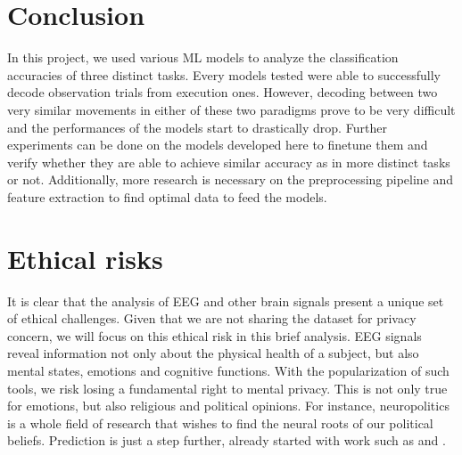 \documentclass[10pt,conference,compsocconf]{IEEEtran}
\begin{document}
\section{Conclusion}
\label{sec:conclusion}
In this project, we used various ML models to analyze the classification accuracies of three distinct tasks. Every models tested were able to successfully decode observation trials from execution ones. However, decoding between two very similar movements in either of these two paradigms prove to be very difficult and the performances of the models start to drastically drop. Further experiments can be done on the models developed here to finetune them and verify whether they are able to achieve similar accuracy as in more distinct tasks or not. Additionally, more research is necessary on the preprocessing pipeline and feature extraction to find optimal data to feed the models.



\newpage
\section{Ethical risks}
It is clear that the analysis of EEG and other brain signals present a unique set of ethical challenges. Given that we are not sharing the dataset for privacy concern, we will focus on this ethical risk in this brief analysis. EEG signals reveal information not only about the physical health of a subject, but also mental states, emotions and cognitive functions. With the popularization of such tools, we risk losing a fundamental right to mental privacy. This is not only true for emotions, but also religious and political opinions. For instance, neuropolitics \cite{neuropolitics} is a whole field of research that wishes to find the neural roots of our political beliefs. Prediction is just a step further, already started with work such as \cite{galli_early_2021} and \cite{yun_erp_2022}.
\end{document}
